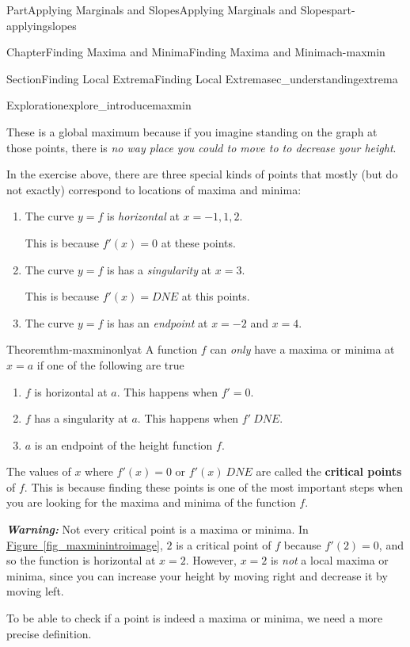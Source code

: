 \documentclass[oneside,10pt,]{tufte-book}
\newcommand{\xreffont}{\relax}
\newcommand{\alert}[1]{\textbf{\textit{#1}}}
\newcommand{\terminology}[1]{\textbf{#1}}
\numberwithin{equation}{chapter}
\begin{document}
\begin{partptx}{Part}{Applying Marginals and Slopes}{}{Applying Marginals and Slopes}{}{}{part-applyingslopes}
\begin{chapterptx}{Chapter}{Finding Maxima and Minima}{}{Finding Maxima and Minima}{}{}{ch-maxmin}
\begin{sectionptx}{Section}{Finding Local Extrema}{}{Finding Local Extrema}{}{}{sec_understandingextrema}
\begin{exploration}{Exploration}{}{explore_introducemaxmin}
\begin{enumerate}[font=\bfseries,label=(\alph*),ref=\alph*]
\par
These is a global maximum because if you imagine standing on the graph at those points, there is \emph{no way place you could to move to to decrease your height}.%
\end{enumerate}%
\end{exploration}%
In the exercise above, there are three special kinds of points that mostly (but do not exactly) correspond to locations of maxima and minima:%
\begin{enumerate}
\item{}The curve \(y=f\) is \emph{horizontal} at \(x=-1,1,2\).%
\par
This is because \(f'(x)=0\) at these points.%
\item{}The curve \(y=f\) is has a \emph{singularity} at \(x=3\).%
\par
This is because \(f'(x)=DNE\) at this points.%
\item{}The curve \(y=f\) is has an \emph{endpoint} at \(x=-2\) and \(x=4\).%
\end{enumerate}
%
\begin{theorem}{Theorem}{}{}{thm-maxminonlyat}%
A function \(f\) can \emph{only} have a maxima or minima at \(x=a\) if one of the following are true%
\begin{enumerate}
\item{}\(f\) is horizontal at \(a\).  This happens when \(f'=0\).%
\item{}\(f\) has a singularity at \(a\).  This happens when \(f'\ DNE\).%
\item{}\(a\) is an endpoint of the height function \(f\).%
\end{enumerate}
%
\end{theorem}
The values of \(x\) where \(f'(x)=0\) or \(f'(x)\ DNE\) are called the \terminology{critical points} of \(f\). This is because finding these points is one of the most important steps when you are looking for the maxima and minima of the function \(f\).%
\par
\alert{Warning:} Not every critical point is a maxima or minima. In \hyperref[fig_maxminintroimage]{Figure~{\xreffont\ref{fig_maxminintroimage}}}, \(2\) is a critical point of \(f\) because \(f'(2)=0\), and so the function is horizontal at \(x=2\).  However, \(x=2\) is \emph{not} a local maxima or minima, since you can increase your height by moving right and decrease it by moving left.%
\par
To be able to check if a point is indeed a maxima or minima, we need a more precise definition.%

\end{sectionptx}
\end{chapterptx}
\end{partptx}
\end{document}
